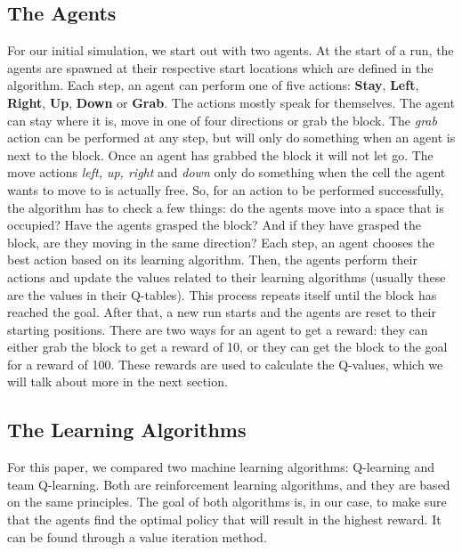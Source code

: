 \subsection{The Agents}
For our initial simulation, we start out with two agents. At the start of a run, the agents are spawned at their respective start locations which are defined in the algorithm. Each step, an agent can perform one of five actions: \textbf{Stay}, \textbf{Left}, \textbf{Right}, \textbf{Up}, \textbf{Down} or \textbf{Grab}. The actions mostly speak for themselves. The agent can stay where it is, move in one of four directions or grab the block. The \textit{grab} action can be performed at any step, but will only do something when an agent is next to the block. Once an agent has grabbed the block it will not let go. The move actions \textit{left, up, right} and \textit{down} only do something when the cell the agent wants to move to is actually free. So, for an action to be performed successfully, the algorithm has to check a few things: do the agents move into a space that is occupied? Have the agents grasped the block? And if they have grasped the block, are they moving in the same direction? 
Each step, an agent chooses the best action based on its learning algorithm. Then, the agents perform their actions and update the values related to their learning algorithms (usually these are the values in their Q-tables). This process repeats itself until the block has reached the goal. After that, a new run starts and the agents are reset to their starting positions. There are two ways for an agent to get a reward: they can either grab the block to get a reward of 10, or they can get the block to the goal for a reward of 100. These rewards are used to calculate the Q-values, which we will talk about more in the next section.

\subsection{The Learning Algorithms}
For this paper, we compared two machine learning algorithms: Q-learning and team Q-learning. Both are reinforcement learning algorithms, and they are based on the same principles. The goal of both algorithms is, in our case, to make sure that the agents find the optimal policy that will result in the highest reward. It can be found through a value iteration method.

